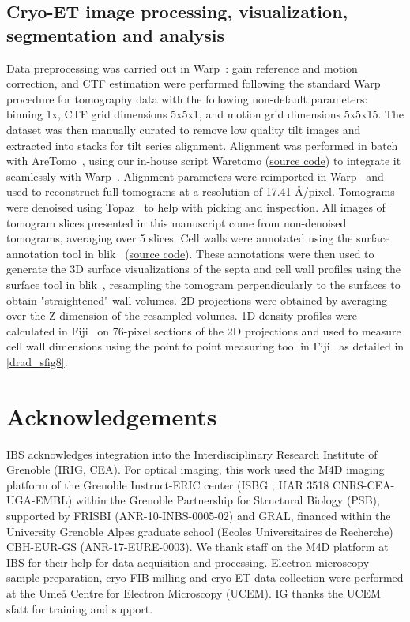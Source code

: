 \subsection{Cryo-ET image processing, visualization, segmentation and analysis}
Data preprocessing was carried out in Warp~\cite{tegunovRealtimeCryoelectronMicroscopy2019}: gain reference and motion correction, and CTF estimation were performed following the standard Warp~\cite{tegunovRealtimeCryoelectronMicroscopy2019} procedure for tomography data with the following non-default parameters: binning 1x, CTF grid dimensions 5x5x1, and motion grid dimensions 5x5x15.
The dataset was then manually curated to remove low quality tilt images and extracted into stacks for tilt series alignment.
Alignment was performed in batch with AreTomo~\cite{zhengAreTomoIntegratedSoftware2022}, using our in-house script Waretomo (\href{https://doi.org/10.5281/zenodo.13350542}{source code}) to integrate it seamlessly with Warp~\cite{tegunovRealtimeCryoelectronMicroscopy2019}.
Alignment parameters were reimported in Warp~\cite{tegunovRealtimeCryoelectronMicroscopy2019} and used to reconstruct full tomograms at a resolution of 17.41 Å/pixel.
Tomograms were denoised using Topaz~\cite{beplerTopazDenoiseGeneralDeep2020} to help with picking and inspection.
All images of tomogram slices presented in this manuscript come from non-denoised tomograms, averaging over 5 slices.
Cell walls were annotated using the surface annotation tool in blik~\cite{gaifasBlikExtensible3D2024} (\href{https://zenodo.org/records/10894490}{source code}).
These annotations were then used to generate the 3D surface visualizations of the septa and cell wall profiles using the surface tool in blik~\cite{gaifasBlikExtensible3D2024}, resampling the tomogram perpendicularly to the surfaces to obtain "straightened" wall volumes.
2D projections were obtained by averaging over the Z dimension of the resampled volumes.
1D density profiles were calculated in Fiji~\cite{schindelinFijiOpensourcePlatform2012} on 76-pixel sections of the 2D projections and used to measure cell wall dimensions using the point to point measuring tool in Fiji~\cite{schindelinFijiOpensourcePlatform2012} as detailed in \autoref{drad_sfig8}.

\section{Acknowledgements}
IBS acknowledges integration into the Interdisciplinary Research Institute of Grenoble (IRIG, CEA). For optical imaging, this work used the M4D imaging platform of the Grenoble Instruct-ERIC center (ISBG ; UAR 3518 CNRS-CEA-UGA-EMBL) within the Grenoble Partnership for Structural Biology (PSB), supported by FRISBI (ANR-10-INBS-0005-02) and GRAL, financed within the University Grenoble Alpes graduate school (Ecoles Universitaires de Recherche) CBH-EUR-GS (ANR-17-EURE-0003). We thank staff on the M4D platform at IBS for their help for data acquisition and processing. Electron microscopy sample preparation, cryo-FIB milling and cryo-ET data collection were performed at the Umeå Centre for Electron Microscopy (UCEM). IG thanks the UCEM sfatt for training and support.

